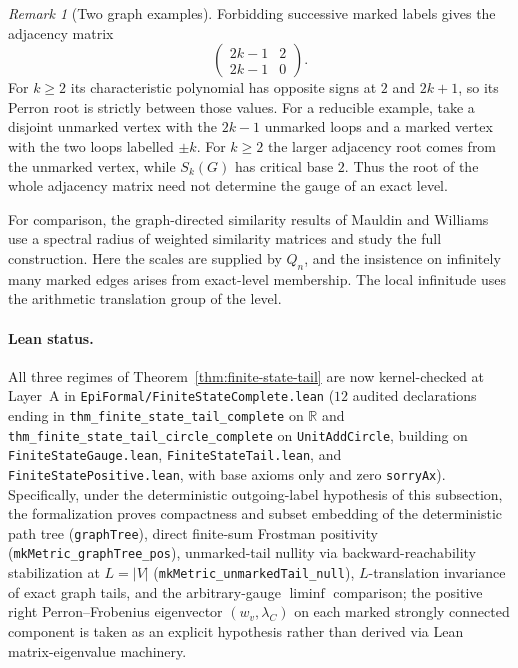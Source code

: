 \documentclass[11pt]{article}
\theoremstyle{definition}
\theoremstyle{remark}
\newtheorem{remark}[theorem]{Remark}
\newcommand{\R}{\mathbb{R}}
\begin{document}
\begin{remark}[Two graph examples]
Forbidding successive marked labels gives the adjacency matrix
\[
 \begin{pmatrix}2k-1&2\\2k-1&0\end{pmatrix}.
\]
For $k\ge2$ its characteristic polynomial has opposite signs at $2$
and $2k+1$, so its Perron root is strictly between those values.
For a reducible example, take a disjoint unmarked vertex with the
$2k-1$ unmarked loops and a marked vertex with the two loops labelled
$\pm k$. For $k\ge2$ the larger adjacency root comes from the unmarked
vertex, while $S_k(G)$ has critical base $2$. Thus the root of the
whole adjacency matrix need not determine the gauge of an exact level.
\end{remark}

For comparison, the graph-directed similarity results of Mauldin
and Williams \cite[Theorems~3 and~4]{MW} use a spectral radius of weighted
similarity matrices and study the full construction. Here the scales
are supplied by $Q_n$, and the insistence on infinitely many marked
edges arises from exact-level membership. The local infinitude uses
the arithmetic translation group of the level.

\paragraph{Lean status.}
All three regimes of Theorem~\ref{thm:finite-state-tail} are now kernel-checked at Layer~A in
\texttt{EpiFormal/\allowbreak Finite\allowbreak State\allowbreak Complete.lean} ($12$ audited declarations
ending in \texttt{thm\_\allowbreak finite\_\allowbreak state\_\allowbreak tail\_\allowbreak complete} on $\R$
and \texttt{thm\_\allowbreak finite\_\allowbreak state\_\allowbreak tail\_\allowbreak circle\_\allowbreak complete}
on \texttt{UnitAddCircle}, building on \texttt{Finite\allowbreak State\allowbreak Gauge.lean},
\texttt{Finite\allowbreak State\allowbreak Tail.lean}, and
\texttt{Finite\allowbreak State\allowbreak Positive.lean}, with base axioms only and zero \texttt{sorryAx}).
Specifically, under the deterministic outgoing-label hypothesis of this subsection, the formalization proves
compactness and subset embedding of the deterministic path tree (\texttt{graphTree}),
direct finite-sum Frostman positivity (\texttt{mkMetric\_\allowbreak graphTree\_\allowbreak pos}),
unmarked-tail nullity via backward-reachability stabilization at $L=|V|$ (\texttt{mkMetric\_\allowbreak unmarkedTail\_\allowbreak null}),
$L$-translation invariance of exact graph tails, and the arbitrary-gauge $\liminf$ comparison;
the positive right Perron--Frobenius eigenvector $(w_v,\lambda_C)$ on each marked strongly connected component is taken as an explicit hypothesis rather than derived via Lean matrix-eigenvalue machinery.
\end{document}
